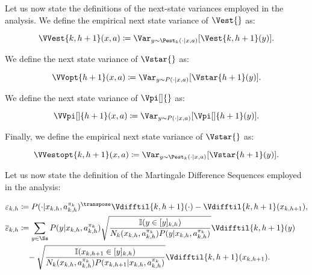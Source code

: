 Let us now state the definitions of the next-state variances employed in the analysis. We define the empirical next state variance of $\Vest{}$ as:

\begin{equation*}
    \VVest{k,h+1} (x,a) \coloneqq \Var_{y \sim \Pest_k (\cdot | x, a)} [\Vest{k,h+1} (y)].
\end{equation*}

We define the next state variance of $\Vstar{}$ as:

\begin{equation*}
    \VVopt{h+1} (x,a) \coloneqq \Var_{y \sim P (\cdot | x,a)} [\Vstar{h+1} (y)].
\end{equation*}

We define the next state variance of $\Vpi[]{}$ as:

\begin{equation*}
    \VVpi[]{h+1} (x,a) \coloneqq \Var_{y \sim P (\cdot | x,a)} [\Vpi[]{h+1} (y)].
\end{equation*}

Finally, we define the empirical next state variance of $\Vstar{}$ as:

\begin{equation*}
    \VVestopt{k,h+1} (x,a) \coloneqq \Var_{y \sim \Pest_k (\cdot | x,a)} [\Vstar{h+1} (y)].
\end{equation*}

Let us now state the definition of the Martingale Difference Sequences employed in the analysis:

\begin{align*}
    \varepsilon_{k,h} &\coloneqq P(\cdot | x_{k,h}, a_{k,h}^{\pi_k})^\transpose \Vdifftil{k,h+1}(\cdot) - \Vdifftil{k,h+1}(x_{k,h+1}), \\
    \overline{\varepsilon}_{k,h} &\coloneqq \sum_{y\in\Ss} P(y|x_{k,h},a_{k,h}^{\pi_k}) \sqrt{\frac{\mathbb{I}(y \in [y]_{k,h})}{N_k(x_{k,h},a_{k,h}^{\pi_k})P(y|x_{k,h},a_{k,h}^{\pi_k})}} \Vdifftil{k,h+1}(y) \\
    &\quad - \sqrt{\frac{\mathbb{I}(x_{k,h+1} \in [y]_{k,h})}{N_k(x_{k,h},a_{k,h}^{\pi_k})P(x_{k,h+1}|x_{k,h},a_{k,h}^{\pi_k})}} \Vdifftil{k,h+1}(x_{k,h+1}).
\end{align*}